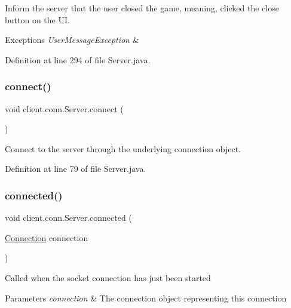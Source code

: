 Inform the server that the user closed the game, meaning, clicked the close button on the UI. 
\begin{DoxyExceptions}{Exceptions}
{\em User\+Message\+Exception} & \\
\hline
\end{DoxyExceptions}


Definition at line 294 of file Server.\+java.

\hypertarget{classclient_1_1conn_1_1_server_a7e96a6bd486520d128a37a8216cf37c3}{}\label{classclient_1_1conn_1_1_server_a7e96a6bd486520d128a37a8216cf37c3} 
\subsubsection{\texorpdfstring{connect()}{connect()}}
{\footnotesize\ttfamily void client.\+conn.\+Server.\+connect (\begin{DoxyParamCaption}{ }\end{DoxyParamCaption})}

Connect to the server through the underlying connection object. 

Definition at line 79 of file Server.\+java.

\hypertarget{classclient_1_1conn_1_1_server_ac8ad09c9052bfb32e082493ada8d14ab}{}\label{classclient_1_1conn_1_1_server_ac8ad09c9052bfb32e082493ada8d14ab} 
\subsubsection{\texorpdfstring{connected()}{connected()}}
{\footnotesize\ttfamily void client.\+conn.\+Server.\+connected (\begin{DoxyParamCaption}\item[{\hyperlink{classsharedlib_1_1conn_1_1_connection}{Connection}}]{connection }\end{DoxyParamCaption})}

Called when the socket connection has just been started


\begin{DoxyParams}{Parameters}
{\em connection} & The connection object representing this connection \\
\hline
\end{DoxyParams}


